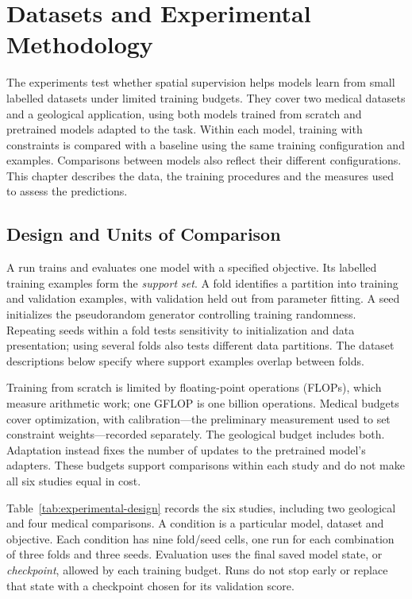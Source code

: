 \documentclass[12pt,a4paper]{article}
\begin{document}
\clearpage
\section{Datasets and Experimental Methodology}
\label{sec:methodology}

The experiments test whether spatial supervision helps models learn from
small labelled datasets under limited training budgets. They cover two
medical datasets and a geological application, using both models trained
from scratch and pretrained models adapted to the task. Within each model,
training with constraints is compared with a baseline using the same
training configuration and examples. Comparisons between models also
reflect their different configurations. This chapter describes the data,
the training procedures and the measures used to assess the predictions.

\subsection{Design and Units of Comparison}
\label{sec:experimental-structure}

A run trains and evaluates one model with a specified objective. Its
labelled training examples form the \emph{support set}. A fold identifies
a partition into training and validation examples, with validation held
out from parameter fitting. A seed initializes the pseudorandom generator
controlling training randomness. Repeating seeds within a fold tests
sensitivity to initialization and data presentation; using several folds
also tests different data partitions. The dataset descriptions below
specify where support examples overlap between folds.

Training from scratch is limited by floating-point operations (FLOPs),
which measure arithmetic work; one GFLOP is one billion operations.
Medical budgets cover optimization, with calibration---the preliminary
measurement used to set constraint weights---recorded separately. The
geological budget includes both. Adaptation instead fixes the number
of updates to the pretrained model's adapters. These budgets support
comparisons within each study and do not make all six studies equal in cost.

Table~\ref{tab:experimental-design} records the six studies, including two
geological and four medical comparisons. A condition is a particular model,
dataset and objective. Each condition has nine fold/seed cells, one run for
each combination of three folds and three seeds. Evaluation uses the
final saved model state, or \emph{checkpoint},
allowed by each training budget. Runs do not stop early or replace that
state with a checkpoint chosen for its validation score.
\end{document}
